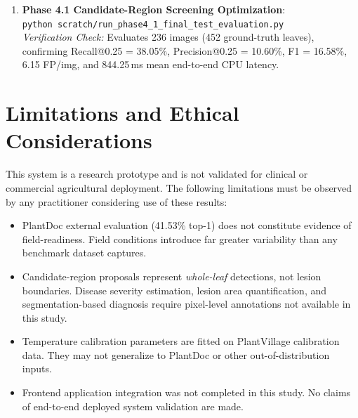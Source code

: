 \documentclass[pdflatex,sn-mathphys-num]{sn-jnl}
\theoremstyle{thmstyleone}%
\theoremstyle{thmstyletwo}%
\theoremstyle{thmstylethree}%
\begin{document}
\begin{enumerate}
        \textit{Verification Check:} Evaluates 236 natural-background test images, confirming 38.98\% Top-1 accuracy, 36.84\% Macro-F1, and selective prediction (93.22\% coverage, 40.91\% selective accuracy at threshold 0.2231).
  \item \textbf{Phase 4.1 Candidate-Region Screening Optimization}:\\
        \texttt{python scratch/run\_phase4\_1\_final\_test\_evaluation.py}\\
        \textit{Verification Check:} Evaluates 236 images (452 ground-truth leaves), confirming Recall@0.25 = 38.05\%, Precision@0.25 = 10.60\%, F1 = 16.58\%, 6.15 FP/img, and 844.25\,ms mean end-to-end CPU latency.
\end{enumerate}


\section*{Limitations and Ethical Considerations}

This system is a research prototype and is not validated for clinical or commercial
agricultural deployment. The following limitations must be observed by any practitioner
considering use of these results:
\begin{itemize}
  \item PlantDoc external evaluation (41.53\% top-1) does not constitute evidence of
        field-readiness. Field conditions introduce far greater variability than any
        benchmark dataset captures.
  \item Candidate-region proposals represent \textit{whole-leaf} detections, not
        lesion boundaries. Disease severity estimation, lesion area quantification,
        and segmentation-based diagnosis require pixel-level annotations not available
        in this study.
  \item Temperature calibration parameters are fitted on PlantVillage calibration data.
        They may not generalize to PlantDoc or other out-of-distribution inputs.
  \item Frontend application integration was not completed in this study.
        No claims of end-to-end deployed system validation are made.
\end{itemize}


\backmatter
\end{document}
